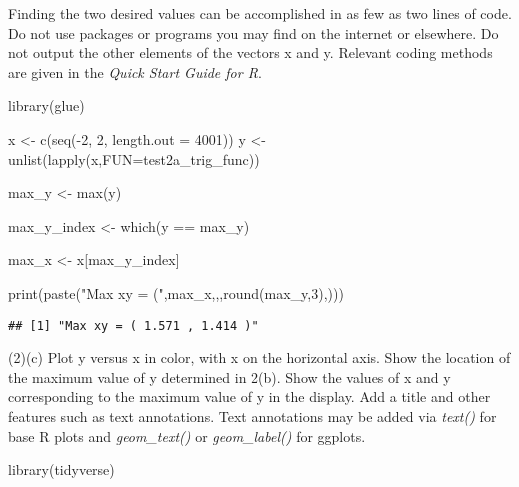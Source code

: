 \documentclass[
]{article}
\newenvironment{Shaded}{\begin{snugshade}}{\end{snugshade}}
\newcommand{\AttributeTok}[1]{\textcolor[rgb]{0.77,0.63,0.00}{#1}}
\newcommand{\DecValTok}[1]{\textcolor[rgb]{0.00,0.00,0.81}{#1}}
\newcommand{\FunctionTok}[1]{\textcolor[rgb]{0.00,0.00,0.00}{#1}}
\newcommand{\NormalTok}[1]{#1}
\newcommand{\OtherTok}[1]{\textcolor[rgb]{0.56,0.35,0.01}{#1}}
\newcommand{\SpecialCharTok}[1]{\textcolor[rgb]{0.00,0.00,0.00}{#1}}
\newcommand{\StringTok}[1]{\textcolor[rgb]{0.31,0.60,0.02}{#1}}
\begin{document}
Finding the two desired values can be accomplished in as few as two
lines of code. Do not use packages or programs you may find on the
internet or elsewhere. Do not output the other elements of the vectors x
and y. Relevant coding methods are given in the \emph{Quick Start Guide
for R}.

\begin{Shaded}
\begin{Highlighting}[]
\FunctionTok{library}\NormalTok{(glue)}

\NormalTok{x }\OtherTok{\textless{}{-}} \FunctionTok{c}\NormalTok{(}\FunctionTok{seq}\NormalTok{(}\SpecialCharTok{{-}}\DecValTok{2}\NormalTok{, }\DecValTok{2}\NormalTok{, }\AttributeTok{length.out =} \DecValTok{4001}\NormalTok{))}
\NormalTok{y }\OtherTok{\textless{}{-}} \FunctionTok{unlist}\NormalTok{(}\FunctionTok{lapply}\NormalTok{(x,}\AttributeTok{FUN=}\NormalTok{test2a\_trig\_func))}

\NormalTok{max\_y }\OtherTok{\textless{}{-}} \FunctionTok{max}\NormalTok{(y)}

\NormalTok{max\_y\_index }\OtherTok{\textless{}{-}} \FunctionTok{which}\NormalTok{(y }\SpecialCharTok{==}\NormalTok{ max\_y)}

\NormalTok{max\_x }\OtherTok{\textless{}{-}}\NormalTok{ x[max\_y\_index]}

\FunctionTok{print}\NormalTok{(}\FunctionTok{paste}\NormalTok{(}\StringTok{"Max xy = ("}\NormalTok{,max\_x,}\StringTok{\textquotesingle{},\textquotesingle{}}\NormalTok{,}\FunctionTok{round}\NormalTok{(max\_y,}\DecValTok{3}\NormalTok{),}\StringTok{\textquotesingle{})\textquotesingle{}}\NormalTok{))}
\end{Highlighting}
\end{Shaded}

\begin{verbatim}
## [1] "Max xy = ( 1.571 , 1.414 )"
\end{verbatim}

(2)(c) Plot y versus x in color, with x on the horizontal axis. Show the
location of the maximum value of y determined in 2(b). Show the values
of x and y corresponding to the maximum value of y in the display. Add a
title and other features such as text annotations. Text annotations may
be added via \emph{text()} for base R plots and \emph{geom\_text()} or
\emph{geom\_label()} for ggplots.

\begin{Shaded}
\begin{Highlighting}[]
\FunctionTok{library}\NormalTok{(tidyverse)}
\end{Highlighting}
\end{Shaded}
\end{document}
